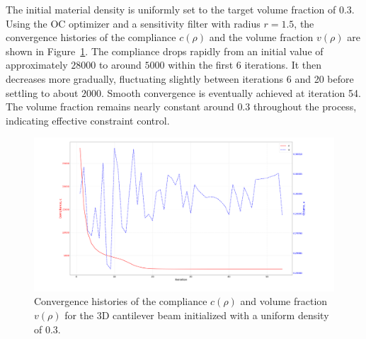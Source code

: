 \documentclass[mathpazo]{cicp}
\begin{document}
The initial material density is uniformly set to the target volume fraction of $0.3$. Using the OC optimizer and a sensitivity filter with radius $r=1.5$, the convergence histories of the compliance $c(\rho)$ and the volume fraction $v(\rho)$ are shown in Figure~\ref{fig:canti_3d_convergence}. The compliance drops rapidly from an initial value of approximately $28000$ to around $5000$ within the first 6 iterations. It then decreases more gradually, fluctuating slightly between iterations 6 and 20 before settling to about $2000$. Smooth convergence is eventually achieved at iteration 54. The volume fraction remains nearly constant around $0.3$ throughout the process, indicating effective constraint control.
\begin{figure}[htp]
	\centering
	\includegraphics[width=1.0\textwidth]{figures/cantilever_3d_convergence.png}
	\caption{Convergence histories of the compliance $c(\rho)$ and volume fraction $v(\rho)$ for the 3D cantilever beam initialized with a uniform density of $0.3$.}
	\label{fig:canti_3d_convergence}
\end{figure}
\end{document}
